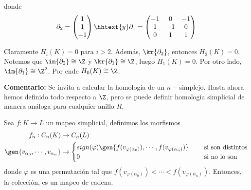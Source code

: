 \documentclass{article}
\begin{document}
\begin{enumerate}
    \vspace{2mm}
    \centerline{
    }
    \vspace{2mm}
    donde
    \begin{equation*}
        \partial_{2}=\begin{pmatrix}
            1 \\ 1 \\ -1
        \end{pmatrix}
        \hhtext{y}
        \partial_{1}=\begin{pmatrix}
            -1 & 0 & -1 \\ 1 & -1 & 0 \\ 0 & 1 & 1
        \end{pmatrix}
    \end{equation*}

    Claramente $H_{i}(K)=0$ para $i>2$. Además, $\kr{\partial_{2}}$, entonces $H_{2}(K)=0$. 
    Notemos que $\im{\partial_{2}}\cong\Z$ y $\kr{\partial_{1}}\cong\Z$, luego $H_{1}(K)=0$. Por
    otro lado, $\im{\partial_{1}}\cong\Z^{2}$. Por ende $H_{0}(K)\cong\Z$.
\end{enumerate}

\vspace{2mm}
\noindent\textbf{Comentario:} Se invita a calcular la homología de un $n-$simplejo. Hasta ahora 
hemos definido todo respecto a $\Z$, pero se puede definir homología simplicial de manera análoga 
para cualquier anillo $R$.

\vspace{2mm}
\begin{lema}
    Sea $f:K\to L$ un mapeo simplicial, definimos los morfismos
    \begin{align*}
        f_{n}:C_{n}(K) &\to C_{n}(L) \\
        \gen{v_{\alpha_{0}},\cdots,v_{\alpha_{n}}} &\to \begin{cases}
            sign(\varphi)\gen{f(v_{\varphi(\alpha_{0})}),\cdots,f(v_{\varphi(\alpha_{n})})} 
            &\quad\text{ si son distintos} \\
            0 &\quad\text{ si no lo son}
        \end{cases}
    \end{align*}
    donde $\varphi$ es una permutación tal que $f(v_{\varphi(\alpha_{0})})<\cdots
    <f(v_{\varphi(\alpha_{n})})$. Entonces, la colección, es un mapeo de cadena.
\end{lema}
\end{document}
